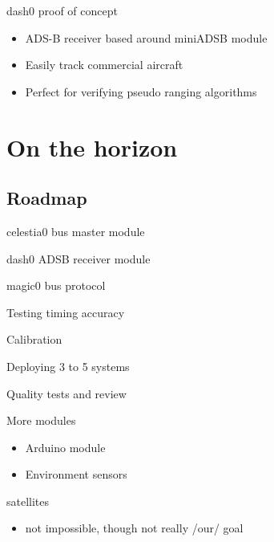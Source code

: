 	\begin{frame}{dash0 proof of concept}
		\begin{itemize}
			\item ADS-B receiver based around miniADSB module
			\item Easily track commercial aircraft
			\item Perfect for verifying pseudo ranging algorithms
		\end{itemize}
	\end{frame}

\section{On the horizon}	

\subsection{Roadmap}
	\begin{frame}{celestia0 bus master module}
	\end{frame}
	\begin{frame}{dash0 ADSB receiver module}
	\end{frame}
	\begin{frame}{magic0 bus protocol}
	\end{frame}
	\begin{frame}{Testing timing accuracy}
	\end{frame}
	\begin{frame}{Calibration}
	\end{frame}
	\begin{frame}{Deploying 3 to 5 systems}
	\end{frame}
	\begin{frame}{Quality tests and review}
	\end{frame}
	\begin{frame}{More modules}
		\begin{itemize}
			\item Arduino module
			\item Environment sensors
		\end{itemize}
	\end{frame}
	\begin{frame}{satellites}
		\begin{itemize}
			\item not impossible, though not really /our/ goal
		\end{itemize}
	\end{frame}

